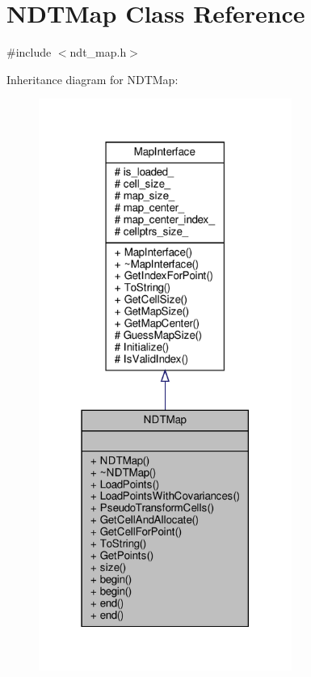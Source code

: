 \hypertarget{classNDTMap}{}\section{N\+D\+T\+Map Class Reference}
\label{classNDTMap}


{\ttfamily \#include $<$ndt\+\_\+map.\+h$>$}



Inheritance diagram for N\+D\+T\+Map\+:\nopagebreak
\begin{figure}[H]
\begin{center}
\leavevmode
\includegraphics[width=235pt]{da/dc7/classNDTMap__inherit__graph}
\end{center}
\end{figure}


